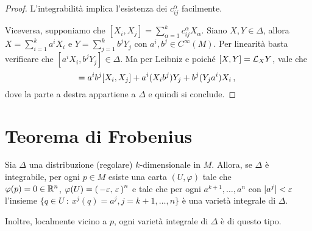 \begin{proof}
	L'integrabilità implica l'esistenza dei $c_{ij}^\alpha$ facilmente.
	
	Viceversa, supponiamo che $[X_i,X_j]=\sum_{\alpha=1}^kc_{ij}^\alpha X_\alpha$. Siano $X,Y\in\Delta$, allora $X=\sum_{i=1}^ka^iX_i$ e $Y=\sum_{j=1}^kb^jY_j$ con $a^i,b^j\in C^\infty(M)$. Per linearità basta verificare che $[a^iX_i,b^jY_j]\in\Delta$.
	Ma per Leibniz e poiché $[X,Y] = \mathcal L_XY$, vale che \begin{equation*}
		[a^iX_i,b^jY_j] = a^ib^j[X_i,X_j]+a^i(X_ib^j)Y_j+b^j(Y_ja^i)X_i\virgola %
	\end{equation*}
	dove la parte a destra appartiene a $\Delta$ e quindi si conclude.
\end{proof}

\section{Teorema di Frobenius}

\begin{theorem}[Frobenius]
	Sia $\Delta$ una distribuzione (regolare) $k$-dimensionale in $M$. Allora, se $\Delta$ è integrabile, per ogni $p\in M$ esiste una carta $(U,\varphi)$ tale che \\
	$\varphi(p) = 0\in\mathbb R^n$, $\varphi(U)=\left(\,-\varepsilon,\,\varepsilon\,\right)^n$ e tale che per ogni $a^{k+1},\ldots,a^n$ con $\lvert a^j\rvert<\varepsilon$ l'insieme $\{q\in U\ : \ x^j(q)=a^j, j=k+1,\ldots,n\}$ è una varietà integrale di $\Delta$.
	
	Inoltre, localmente vicino a $p$, ogni varietà integrale di $\Delta$ è di questo tipo.
\end{theorem}

